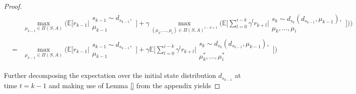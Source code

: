 \documentclass[11pt]{article} %
\begin{document}
\begin{proof}
\begin{equation}
	\begin{array}{rcl}
		& 	&	\max\limits_{\mu_{k-1} \in \Pi(S,A)} \Big( \mathbb{E}\Big[ r_{k-1} \Big| \begin{array}{c}
																						s_{k-1} \sim d_{s_{k-1}}, \\
																						\mu_{k-1}
																					\end{array} \Big]  + \gamma \max\limits_{(\mu_k,\dots,\mu_i) \in \Pi(S,A)^{i-k+1}} \Big( \mathbb{E} \Big[ \sum\limits_{l=0}^{i-k} \gamma^l r_{k+l} \Big| \begin{array}{c}
																																																s_k \sim d_{s_k}(d_{s_{k-1}},\mu_{k-1}), \\
																																																\mu_k,\dots,\mu_i
																																															\end{array} \Big] \Big) \Big) \\
		& =	&	\max\limits_{\mu_{k-1} \in \Pi(S,A)} \Big( \mathbb{E}\Big[ r_{k-1} \Big| \begin{array}{c}
																						s_{k-1} \sim d_{s_{k-1}}, \\
																						\mu_{k-1}
																					\end{array} \Big]  + \gamma  \mathbb{E} \Big[ \sum\limits_{l=0}^{i-k} \gamma^l r_{k+l} \Big| \begin{array}{c}
																																																s_k \sim d_{s_k}(d_{s_{k-1}},\mu_{k-1}), \\
																																																\mu_k^*,\dots,\mu_i^*
																																															\end{array} \Big] \Big)
	\end{array}
\end{equation}

Further decomposing the expectation over the initial state distribution $d_{s_{k-1}}$ at time $t = k-1$ and making use of Lemma \ref{} from the appendix yields


\end{proof}
\end{document}
